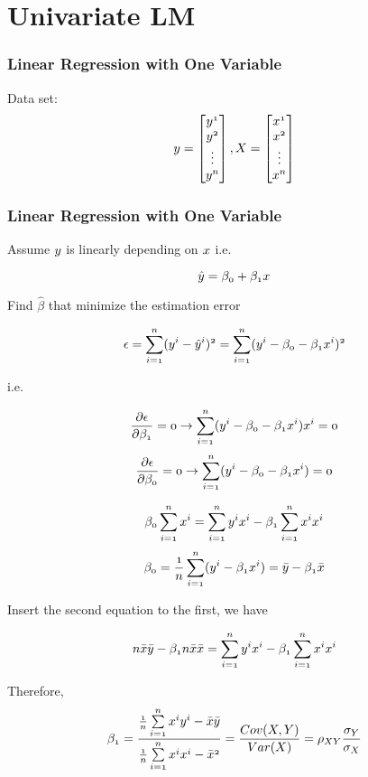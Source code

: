 \documentclass[notheorems, aspectratio=54]{beamer}
\begin{document}
\section{Univariate LM}

\begin{frame}

\frametitle{Linear Regression with One Variable}
Data set:
$$
\mathnormal{y}=
\begin{bmatrix}
    \mathnormal{y^{1}}\\
    \mathnormal{y^{2}}\\
	\vdots\\
    \mathnormal{y^{n}}
\end{bmatrix}
,
\mathnormal{X}=
\begin{bmatrix}
    \mathnormal{x^{1}}\\
    \mathnormal{x^{2}}\\
	\vdots\\
    \mathnormal{x^{n}}
\end{bmatrix}
$$
\end{frame}

\begin{frame}
\frametitle{Linear Regression with One Variable}
Assume $\mathnormal{y}$ is linearly depending on $\mathnormal{x}$ i.e.

$$
\mathnormal{\hat{y} =\beta_0 + \beta_1 x}
$$

Find $\hat{\beta}$ that minimize the estimation error

$$
\mathnormal{\epsilon=\sum\limits_{i=1}^{n}(y^{i}-\hat{y}^{i})^2 = \sum\limits_{i=1}^{n} (y^{i}-{\beta_0}-{\beta_1} x^{i})^2}
$$

i.e.

$$
\mathnormal{\frac{\partial \epsilon}{\partial {\beta}_1}=0
\rightarrow
\sum\limits_{i=1}^{n}(y^{i}-{\beta_0}-{\beta_1} x^{i})x^{i}=0}
$$
$$
\mathnormal{
\frac{\partial \epsilon}{\partial {\beta}_0}=0
\rightarrow
\sum\limits_{i=1}^{n}(y^{i}-{\beta_0}-{\beta_1} x^{i})=0
}
$$

\end{frame}

\begin{frame}

$$
\mathnormal{
\beta_0\sum\limits_{i=1}^{n}x^{i}=\sum\limits_{i=1}^{n}y^{i}x^{i}-\beta_1\sum\limits_{i=1}^{n}x^{i}x^{i}
}
$$
\begin{align*}
\mathnormal{
{\beta_0}=\frac{1}{n}\sum\limits_{i=1}^{n}(y^{i}-{\beta_1} x^{i})=\bar{y}-{\beta_1} \bar{x}
}
\end{align*}

Insert the second equation to the first, we have

$$\mathnormal{n\bar{x}\bar{y}-{\beta_1}n\bar{x}\bar{x}=\sum\limits_{i=1}^{n}y^{i}x^{i}-{\beta_1}\sum\limits_{i=1}^{n}x^{i}x^{i}}
$$

Therefore, 
$$\mathnormal{
{\beta_1}=\frac{\frac{1}{n}\sum\limits_{i=1}^{n}x^{i}y^{i}-\bar{x}\bar{y}}{\frac{1}{n}\sum\limits_{i=1}^{n}x^{i}x^{i}-\bar{x}^2}=\frac{Cov(X,Y)}{Var(X)}=\rho_{XY}\frac{\sigma_{Y}}{\sigma_{X}}
}
$$
\end{frame}
\end{document}
